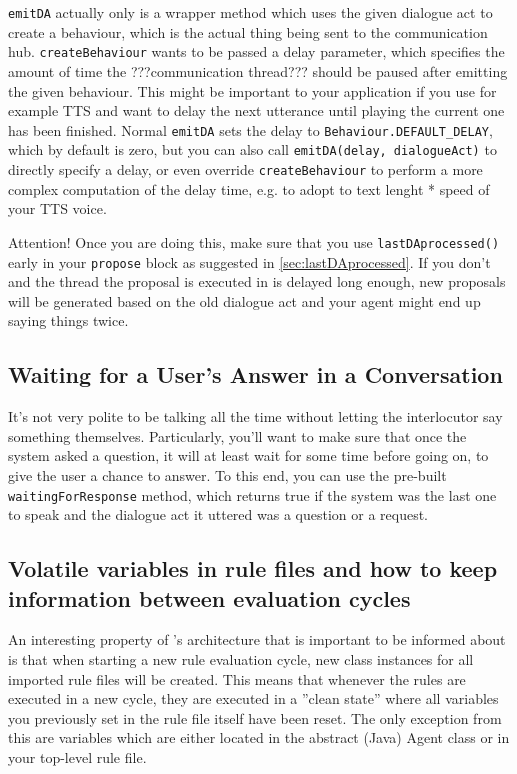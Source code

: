 \texttt{emitDA} actually only is a wrapper method which uses the given dialogue act to create a behaviour, which is the actual thing being sent to the communication hub. \texttt{createBehaviour} wants to be passed a delay parameter, which specifies the amount of time the ???communication thread??? 
should be paused after emitting the given behaviour. This might be important to your application if you use for example TTS and want to delay the next utterance until playing the current one has been finished.
Normal \texttt{emitDA} sets the delay to \texttt{Behaviour.DEFAULT\_DELAY}, which by default is zero, but you can also call \texttt{emitDA(delay, dialogueAct)} to directly specify a delay, or even override \texttt{createBehaviour} to perform a more complex computation of the delay time, e.g. to adopt to text lenght * speed of your TTS voice.

Attention! Once you are doing this, make sure that you use \texttt{lastDAprocessed()} early in your \texttt{propose} block as suggested in \ref{sec:lastDAprocessed}. If you don't and the thread the proposal is executed in is delayed long enough, new proposals will be generated based on the old dialogue act and your agent might end up saying things twice.

\subsection{Waiting for a User's Answer in a Conversation}

It's not very polite to be talking all the time without letting the interlocutor say something themselves. Particularly, you'll want to make sure that once the system asked a question, it will at least wait for some time before going on, to give the user a chance to answer. To this end, you can use the pre-built \texttt{waitingForResponse} method, which returns true if the system was the last one to speak and the dialogue act it uttered was a question or a request.

\subsection{Volatile variables in rule files and how to keep information between evaluation cycles} \label{sec:volatile}

An interesting property of \vonda's architecture that is important to be informed about is that when starting a new rule evaluation cycle, new class instances for all imported rule files will be created. This means that whenever the \vonda rules are executed in a new cycle, they are executed in a ''clean state'' where all variables you previously set in the rule file itself have been reset. The only exception from this are variables which are either located in the abstract (Java) Agent class or in your top-level rule file.

